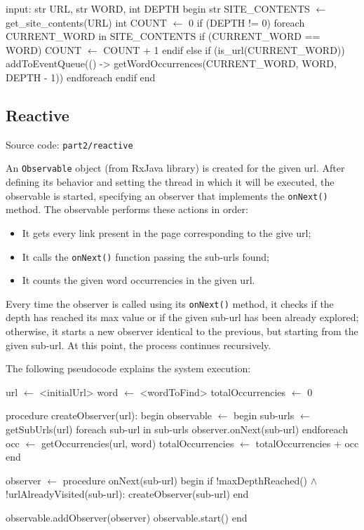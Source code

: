 \documentclass[12pt, a4paper]{report}
\begin{document}
\begin{algorithm}[label={alg3}]
input: str URL, str WORD, int DEPTH
begin
    str SITE_CONTENTS $\gets$ get_site_contents(URL)
    int COUNT $\gets$ 0
    if (DEPTH != 0)
        foreach CURRENT_WORD in SITE_CONTENTS
            if (CURRENT_WORD == WORD)
                COUNT $\gets$ COUNT + 1
            endif
            else if (is_url(CURRENT_WORD))
                addToEventQueue(() -> 
                    getWordOccurrences(CURRENT_WORD, WORD, DEPTH - 1))
        endforeach
    endif
end       
\end{algorithm}

\subsection{Reactive}
Source code: \texttt{part2/reactive}

An \texttt{Observable} object (from RxJava library) is created  for the given url.
After defining its behavior and setting the thread in which it will be executed, the observable is started, specifying an observer that implements the \texttt{onNext()} method.
The observable performs these actions in order:
\begin{itemize}
    \item It gets every link present in the page corresponding to the give url;
    \item It calls the \texttt{onNext()} function passing the sub-urls found;
    \item It counts the given word occurrencies in the given url.
\end{itemize}
Every time the observer is called using its \texttt{onNext()} method, it checks if the depth has reached its max value or if the given sub-url has been already explored; otherwise, it starts a new observer identical to the previous, but starting from the given sub-url.
At this point, the process continues recursively.

The following pseudocode explains the system execution:

\begin{algorithm}[label={alg4}]
url $\gets$ <initialUrl>
word $\gets$ <wordToFind>
totalOccurrencies $\gets$ 0

procedure createObserver(url):
    begin
        observable $\gets$ 
            begin
                sub-urls $\gets$ getSubUrls(url)
                foreach sub-url in sub-urls
                    observer.onNext(sub-url)
                endforeach
                occ $\gets$ getOccurrencies(url, word)
                totalOccurrencies $\gets$ totalOccurrencies + occ
            end
        
        observer $\gets$
            procedure onNext(sub-url)
                begin
                    if !maxDepthReached() $\wedge$ !urlAlreadyVisited(sub-url):
                        createObserver(sub-url)
                end

        observable.addObserver(observer)
        observable.start()
    end
\end{algorithm}
\end{document}
